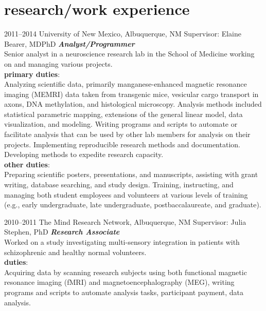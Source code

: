 \documentclass[]{friggeri-cv} %
\begin{document}
\section{research/work experience}

\begin{entrylist}
\entry
{\footnotesize{2011--2014}}
{University of New Mexico, Albuquerque, NM \textemdash Supervisor: Elaine Bearer, MD\textendash PhD}
{}
{\emph{\textbf{Analyst/Programmer}} \\
Senior analyst in a neuroscience research lab in the School of Medicine 
working on and managing various projects. \\
\textbf{primary duties}: \\
Analyzing scientific data, primarily manganese-enhanced magnetic resonance imaging (MEMRI) data 
taken from transgenic mice,
vesicular cargo transport in axons, 
DNA methylation, and histological microscopy. Analysis methods included
statistical parametric mapping, 
extensions of the general linear model, 
data visualization, and modeling.
Writing programs and scripts to automate or facilitate analysis 
that can be used by other lab members for analysis on their projects. 
Implementing reproducible research methods and documentation. 
Developing methods to expedite research capacity. \\
\textbf{other duties}: \\
Preparing scientific posters, presentations, and manuscripts, 
assisting with grant writing, database searching, and study design. 
Training, instructing, and managing both student employees and volunteers at various levels of training 
(e.g., early undergraduate, late undergraduate, postbaccalaureate, and graduate). }
\end{entrylist}

\begin{entrylist}
\entry
{\footnotesize{2010--2011}}
{The Mind Research Network, Albuquerque, NM \textemdash Supervisor: Julia Stephen, PhD}
{}
{\emph{\textbf{Research Associate}} \\
Worked on a study investigating multi-sensory integration in
patients with schizophrenic and healthy normal volunteers. \\
\textbf{duties}:\\
Acquiring data by scanning research subjects using both functional
magnetic resonance imaging (fMRI) and magnetoencephalography (MEG), writing
programs and scripts to automate analysis tasks, 
participant payment, data analysis.} \\ \\ 
\end{entrylist}
\end{document}
